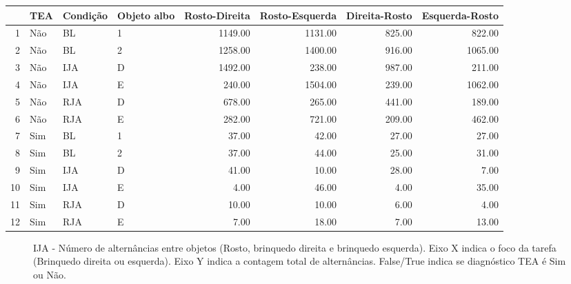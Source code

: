 \documentclass{article}
\begin{document}
\begin{table}[ht]
\centering
\begin{tabular}{rlllrrrr}
  \hline
 & TEA & Condição & Objeto albo & Rosto-Direita & Rosto-Esquerda & Direita-Rosto & Esquerda-Rosto \\
  \hline
  1 & Não & BL & 1 & 1149.00 & 1131.00 & 825.00 & 822.00 \\
  2 & Não & BL & 2 & 1258.00 & 1400.00 & 916.00 & 1065.00 \\
  3 & Não & IJA & D & 1492.00 & 238.00 & 987.00 & 211.00 \\
  4 & Não & IJA & E & 240.00 & 1504.00 & 239.00 & 1062.00 \\
  5 & Não & RJA & D & 678.00 & 265.00 & 441.00 & 189.00 \\
  6 & Não & RJA & E & 282.00 & 721.00 & 209.00 & 462.00 \\
  7 & Sim & BL & 1 & 37.00 & 42.00 & 27.00 & 27.00 \\
  8 & Sim & BL & 2 & 37.00 & 44.00 & 25.00 & 31.00 \\
  9 & Sim & IJA & D & 41.00 & 10.00 & 28.00 & 7.00 \\
  10 & Sim & IJA & E & 4.00 & 46.00 & 4.00 & 35.00 \\
  11 & Sim & RJA & D & 10.00 & 10.00 & 6.00 & 4.00 \\
  12 & Sim & RJA & E & 7.00 & 18.00 & 7.00 & 13.00 \\
   \hline
\end{tabular}
\end{table}


\begin{figure}[]
\caption{IJA - Número de alternâncias entre objetos (Rosto, brinquedo direita e brinquedo esquerda). Eixo X indica o foco da tarefa (Brinquedo direita ou esquerda). Eixo Y indica a contagem total de alternâncias. False/True indica se diagnóstico TEA é Sim ou Não.}
\noindent{}
\centering
\end{figure}
\end{document}
